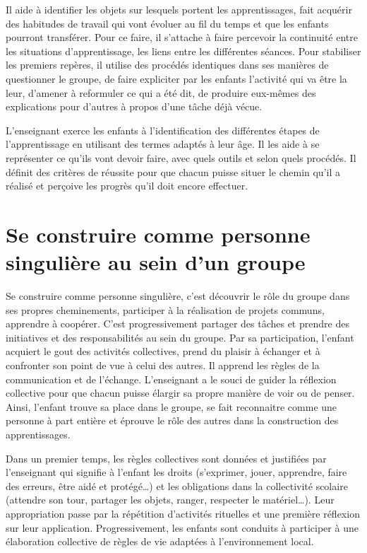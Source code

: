 Il aide à identifier les objets sur lesquels portent les apprentissages, fait acquérir des habitudes de travail qui vont évoluer au fil du temps et que les enfants pourront transférer. Pour ce faire, il s’attache à faire percevoir la continuité entre les situations d’apprentissage, les liens entre les différentes séances. Pour stabiliser les premiers repères, il utilise des procédés identiques dans ses manières de questionner le groupe, de faire expliciter par les enfants l’activité qui va être la leur, d’amener à reformuler ce qui a été dit, de produire eux-mêmes des explications pour d’autres à propos d’une tâche déjà vécue. 

L’enseignant exerce les enfants à l’identification des différentes étapes de l’apprentissage en utilisant des termes adaptés à leur âge. Il les aide à se représenter ce qu’ils vont devoir faire, avec quels outils et selon quels procédés. Il définit des critères de réussite pour que chacun puisse situer le chemin qu’il a réalisé et perçoive les progrès qu’il doit encore effectuer.

\section{Se construire comme personne singulière au sein d’un groupe}
Se construire comme personne singulière, c'est découvrir le rôle du groupe dans ses propres cheminements, participer à la réalisation de projets communs, apprendre à coopérer. C'est progressivement partager des tâches et prendre des initiatives et des responsabilités au sein du groupe. Par sa participation, l'enfant acquiert le gout des activités collectives, prend du plaisir à échanger et à confronter son point de vue à celui des autres. Il apprend les règles de la communication et de l’échange. L’enseignant a le souci de guider la réflexion collective pour que chacun puisse élargir sa propre manière de voir ou de penser. Ainsi, l’enfant trouve sa place dans le groupe, se fait reconnaitre comme une personne à part entière et éprouve le rôle des autres dans la construction des apprentissages.

Dans un premier temps, les règles collectives sont données et justifiées par l'enseignant qui signifie à l'enfant les droits (s’exprimer, jouer, apprendre, faire des erreurs, être aidé et protégé\dots) et les obligations dans la collectivité scolaire (attendre son tour, partager les objets, ranger, respecter le matériel\dots). Leur appropriation passe par la répétition d'activités rituelles et une première réflexion sur leur application. Progressivement, les enfants sont conduits à participer à une élaboration collective de règles de vie adaptées à l’environnement local. 

